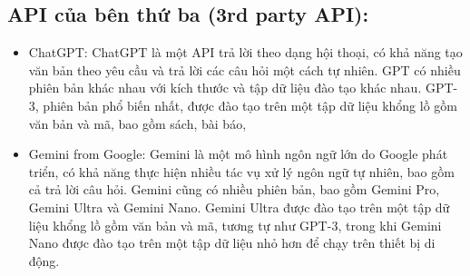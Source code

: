 \subsection{API của bên thứ ba (3rd party API):}\label{subsec:api-cua-ben-thu-ba-(3rd-party-api):}
\begin{itemize}
    \item
    ChatGPT: ChatGPT là một API trả lời theo dạng hội thoại, có khả năng tạo văn bản theo yêu cầu và trả lời các câu hỏi một cách tự nhiên.
    GPT có nhiều phiên bản khác nhau với kích thước và tập dữ liệu đào tạo khác nhau. GPT-3, phiên bản phổ biến nhất, được đào tạo trên một tập dữ liệu khổng lồ gồm văn bản và mã, bao gồm sách, bài báo,
    \item
    Gemini from Google: Gemini là một mô hình ngôn ngữ lớn do Google phát triển, có khả năng thực hiện nhiều tác vụ xử lý ngôn ngữ tự nhiên, bao gồm cả trả lời câu hỏi.
    Gemini cũng có nhiều phiên bản, bao gồm Gemini Pro, Gemini Ultra và Gemini Nano. Gemini Ultra được đào tạo trên một tập dữ liệu khổng lồ gồm văn bản và mã, tương tự như GPT-3, trong khi Gemini Nano được đào tạo trên một tập dữ liệu nhỏ hơn để chạy trên thiết bị di động.
\end{itemize}

